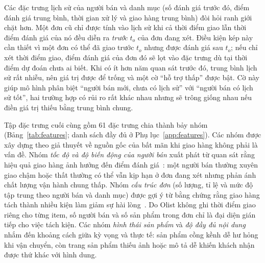 Các đặc trưng lịch sử của người bán và danh mục (số đánh giá trước đó, điểm đánh giá trung bình, thời gian xử lý và giao hàng trung bình) đòi hỏi ranh giới chặt hơn. Một đơn cũ chỉ được tính vào lịch sử khi cả thời điểm giao lẫn thời điểm đánh giá của nó đều diễn ra \emph{trước} $t_o$ của đơn đang xét. Điều kiện kép này cần thiết vì một đơn có thể đã giao trước $t_o$ nhưng được đánh giá sau $t_o$; nếu chỉ xét thời điểm giao, điểm đánh giá của đơn đó sẽ lọt vào đặc trưng dù tại thời điểm dự đoán chưa ai biết. Khi có ít hơn năm quan sát trước đó, trung bình lịch sử rất nhiễu, nên giá trị được để trống và một cờ ``hỗ trợ thấp'' được bật. Cờ này giúp mô hình phân biệt ``người bán mới, chưa có lịch sử'' với ``người bán có lịch sử tốt'', hai trường hợp có rủi ro rất khác nhau nhưng sẽ trông giống nhau nếu điền giá trị thiếu bằng trung bình chung.

Tập đặc trưng cuối cùng gồm 61 đặc trưng chia thành bảy nhóm (Bảng~\ref{tab:features}; danh sách đầy đủ ở Phụ lục~\ref{app:features}). Các nhóm được xây dựng theo giả thuyết về nguồn gốc của bất mãn khi giao hàng không phải là vấn đề. Nhóm \emph{tốc độ và độ biến động của người bán} xuất phát từ quan sát rằng hiệu quả giao hàng ảnh hưởng đến điểm đánh giá~\cite{ravula2023,deshpande2023}: một người bán thường xuyên giao chậm hoặc thất thường có thể vẫn kịp hạn ở đơn đang xét nhưng phản ánh chất lượng vận hành chung thấp. Nhóm \emph{cấu trúc đơn} (số lượng, tỉ lệ và mức độ tập trung theo người bán và danh mục) được gợi ý từ bằng chứng rằng giao hàng tách thành nhiều kiện làm giảm sự hài lòng~\cite{brylla2022}. Do Olist không ghi thời điểm giao riêng cho từng item, số người bán và số sản phẩm trong đơn chỉ là đại diện gián tiếp cho việc tách kiện. Các nhóm \emph{hình thái sản phẩm} và \emph{độ đầy đủ nội dung} nhắm đến khoảng cách giữa kỳ vọng và thực tế: sản phẩm cồng kềnh dễ hư hỏng khi vận chuyển, còn trang sản phẩm thiếu ảnh hoặc mô tả dễ khiến khách nhận được thứ khác với hình dung.

